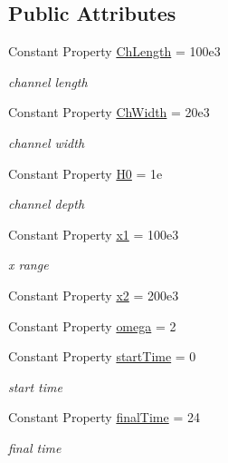 \subsection*{Public Attributes}
\begin{DoxyCompactItemize}
\item 
Constant Property \hyperlink{class_open_channel_varying_bottom3d_aa9f365b05d6d45cbacd9906ae453e1ca}{Ch\+Length} = 100e3
\begin{DoxyCompactList}\small\item\em channel length \end{DoxyCompactList}\item 
Constant Property \hyperlink{class_open_channel_varying_bottom3d_a8765635eb4dec967174f66a47a5c0627}{Ch\+Width} = 20e3
\begin{DoxyCompactList}\small\item\em channel width \end{DoxyCompactList}\item 
Constant Property \hyperlink{class_open_channel_varying_bottom3d_adb48311ba4ff71a1a33920a63c62ebdd}{H0} = 1e
\begin{DoxyCompactList}\small\item\em channel depth \end{DoxyCompactList}\item 
Constant Property \hyperlink{class_open_channel_varying_bottom3d_a7f614d84cef81b7f55dcec4167216b29}{x1} = 100e3
\begin{DoxyCompactList}\small\item\em x range \end{DoxyCompactList}\item 
Constant Property \hyperlink{class_open_channel_varying_bottom3d_a8a6e290d11b4160812d5dc4cd4d2be6f}{x2} = 200e3
\item 
Constant Property \hyperlink{class_open_channel_varying_bottom3d_a658065aff406fc1a41a3c1079a375751}{omega} = 2
\item 
Constant Property \hyperlink{class_open_channel_varying_bottom3d_afaa7cb499282d39d677c56b524e9090d}{start\+Time} = 0
\begin{DoxyCompactList}\small\item\em start time \end{DoxyCompactList}\item 
Constant Property \hyperlink{class_open_channel_varying_bottom3d_aaf37ba426c9aed35f49311fb0176e90a}{final\+Time} = 24
\begin{DoxyCompactList}\small\item\em final time \end{DoxyCompactList}\item 

\end{DoxyCompactItemize}
